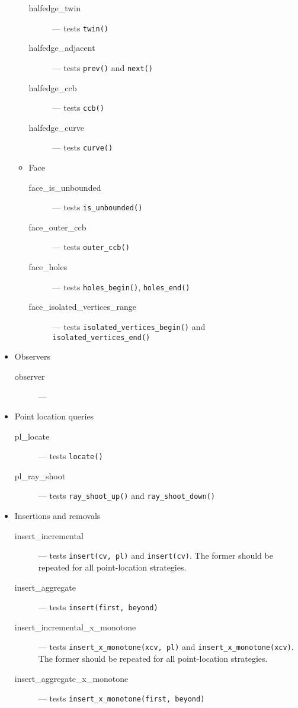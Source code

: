 \documentclass[11pt,a4paper]{article}
\begin{document}
\begin{itemize}
\begin{itemize}
\begin{description}
    \item[halfedge\_twin] --- tests {\tt twin()}
    \item[halfedge\_adjacent] --- tests {\tt prev()} and {\tt next()}
    \item[halfedge\_ccb] --- tests {\tt ccb()}
    \item[halfedge\_curve] --- tests {\tt curve()}
    \end{description}
  \item Face
    \begin{description}
    \item[face\_is\_unbounded] --- tests {\tt is\_unbounded()}
    \item[face\_outer\_ccb] --- tests {\tt outer\_ccb()}
    \item[face\_holes] --- tests {\tt holes\_begin()}, {\tt holes\_end()}
    \item[face\_isolated\_vertices\_range] --- tests
      {\tt isolated\_vertices\_begin()} and {\tt isolated\_vertices\_end()}
    \end{description}
    \end{itemize}
\item Observers
  \begin{description}
  \item[observer] --- 
  \end{description}
\item Point location queries
  \begin{description}
  \item[pl\_locate] --- tests {\tt locate()}
  \item[pl\_ray\_shoot] --- tests {\tt ray\_shoot\_up()} and
    {\tt ray\_shoot\_down()}
  \end{description}  
\item Insertions and removals
  \begin{description}
  \item[insert\_incremental] --- tests {\tt insert(cv, pl)} and
    {\tt insert(cv)}. The former should be repeated for all
    point-location strategies.
  \item[insert\_aggregate] --- tests {\tt insert(first, beyond)}
  \item[insert\_incremental\_x\_monotone] --- tests
    {\tt insert\_x\_monotone(xcv, pl)} and
    {\tt insert\_x\_monotone(xcv)}. The former should be repeated for
    all point-location strategies.
  \item[insert\_aggregate\_x\_monotone] --- tests
    {\tt insert\_x\_monotone(first, beyond)}

\end{description}
\end{itemize}
\end{document}

